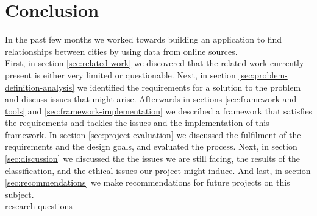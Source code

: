 \chapter{Conclusion}
In the past few months we worked towards building an application to find relationships between cities by using data from online sources.  \\


First, in section \ref{sec:related work} we discovered that the related work currently present is either very limited or questionable. Next, in section \ref{sec:problem-definition-analysis} we identified the requirements for a solution to the problem and discuss issues that might arise. Afterwards in sections \ref{sec:framework-and-tools} and \ref{sec:framework-implementation} we described a framework that satisfies the requirements and tackles the issues and the implementation of this framework. In section \ref{sec:project-evaluation} we discussed the fulfilment of the requirements and the design goals, and evaluated the process. Next, in section \ref{sec:discussion} we discussed the the issues we are still facing, the results of the classification, and the ethical issues our project might induce. And last, in section \ref{sec:recommendations} we make recommendations for future projects on this subject. \\

research questions



